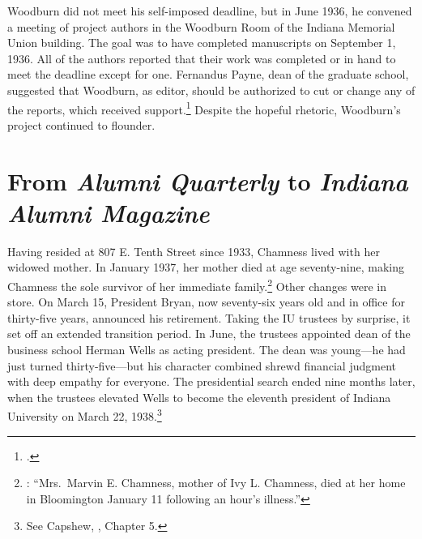 \documentclass[
  american,
  letterpaper,
]{scrreprt}
\begin{document}
Woodburn did not meet his self-imposed deadline, but in June 1936, he
convened a meeting of project authors in the Woodburn Room of the
Indiana Memorial Union building. The goal was to have completed
manuscripts on September 1, 1936. All of the authors reported that their
work was completed or in hand to meet the deadline except for one.
Fernandus Payne, dean of the graduate school, suggested that Woodburn,
as editor, should be authorized to cut or change any of the reports,
which received support.\footnote{.}
Despite the hopeful rhetoric, Woodburn's project continued to flounder.

\section{\texorpdfstring{From \emph{Alumni Quarterly} to \emph{Indiana
Alumni
Magazine}}{From Alumni Quarterly to Indiana Alumni Magazine}}\label{from-alumni-quarterly-to-indiana-alumni-magazine}

Having resided at 807 E. Tenth Street since 1933, Chamness lived with
her widowed mother. In January 1937, her mother died at age
seventy-nine, making Chamness the sole survivor of her immediate
family.\footnote{: ``Mrs.~Marvin E. Chamness, mother of Ivy L. Chamness, died at her
  home in Bloomington January 11 following an hour's illness.''} Other
changes were in store. On March 15, President Bryan, now seventy-six
years old and in office for thirty-five years, announced his retirement.
Taking the IU trustees by surprise, it set off an extended transition
period. In June, the trustees appointed dean of the business school
Herman Wells as acting president. The dean was young---he had just
turned thirty-five---but his character combined shrewd financial
judgment with deep empathy for everyone. The presidential search ended
nine months later, when the trustees elevated Wells to become the
eleventh president of Indiana University on March 22, 1938.\footnote{See
  Capshew, , Chapter
  5.}
\end{document}

